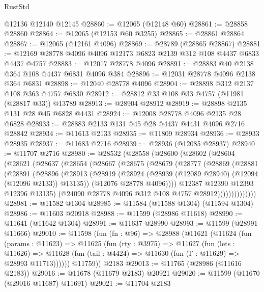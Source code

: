 \begin{lexlean}{RustStd}
\begin{coremodule}
    @12136
    @12140
    @12145
@28860 := @12065 (@12148 @60)
@28861 := @28858 @28860
@28864 := @12065 (@12153 @60 @3255)
@28865 := @28861 @28864
@28867 := @12065 (@12161 @4096)
@28869 := @28789 (@28865 @28867)
@28881 := @12169 @28778 @4096 @4096 @12173 @6823 @2139 @312 @108 @4437 @6833 @4437 @4757
@28883 := @12017 @28778 @4096
@28891 := @28883 @40 @2138 @364 @108 @4437 @6831 @4096 @384
@28896 := @12031 @28778 @4096 @2138 @364 @6831
@28898 := @12040 @28778 @4096
@28904 := @28898 @312 @2137 @108 @363 @4757 @6830
@28912 := @28812 @33 @108 @33 @4757 (@11981 (@28817 @33)) @13789
@28913 := @28904 @28912
@28919 := @28898 @2135 @131 @28 @45 @6828 @4431
@28924 := @12008 @28778 @4096 @2135 @28 @6828
@28933 := @28883 @2133 @131 @45 @28 @4437 @4431 @4096 @2716 @28842
@28934 := @11613 @2133
@28935 := @11809 @28934
@28936 := @28933 @28935
@28937 := @11683 @2716
@28939 := @28936 (@12085 @28937)
@28940 := @11707 @2716
@28980 := @28532
    (@28558
      (@28600
        (@28602
          (@28604
            (@28621
              (@28637
                (@28654
                  (@28667
                    (@28675
                      (@28679
                        (@28777
                          (@28869
                            (@28881
                              (@28891
                                (@28896
                                  (@28913
                                    (@28919
                                      (@28924
                                        (@28939 (@12089 @28940) (@12094 (@12096 @2133)) @13135))
                                      (@12076 @28778 @4096))))
                                @12387
                                @12390
                                @12393
                                @12396
                                @13135)
                              (@24090 @28778 @4096 @312 @108 @4757 @28912))))))))))))))
@28981 := @11582 @1304
@28985 := @11584 (@11588 @1304) (@11594 @1304)
@28986 := @11603 @20918
@28988 := @11599 (@28986 @11618)
@28990 := @11641 (@11642 @1304)
@28991 := @11637 @28990
@28993 := @11599 (@28991 @11666)
@29010 := @11598
    (fun (fn : @96) =>
    @28988
      (@11621
        (@11624
          (fun (params : @11623) =>
          @11625
            (fun (rty : @3975) =>
            @11627
              (fun (lets : @11626) =>
              @11628 (fun (tail : @4424) => @11630 (fun (Γ : @11629) => @28993 @11713))))))
        @11759))
    @2183
@29013 := @11765 (@28986 (@11616 @2183))
@29016 := @11678 (@11679 @2183) @20921
@29020 := @11599 (@11670 (@29016 @11687) @11691)
@29021 := @11704 @2183

\end{coremodule}
\end{lexlean}

